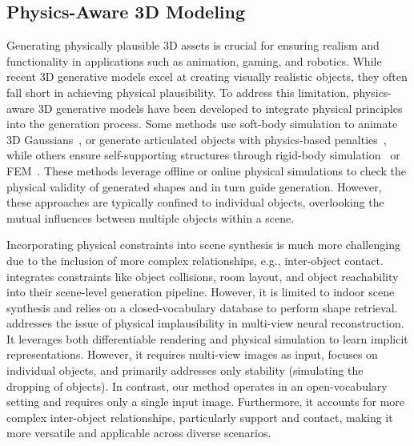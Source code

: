 \subsection{Physics-Aware 3D Modeling}
Generating physically plausible 3D assets is crucial for ensuring realism and functionality in applications such as animation, gaming, and robotics.
While recent 3D generative models excel at creating visually realistic objects, they often fall short in achieving physical plausibility. To address this limitation, physics-aware 3D generative models have been developed to integrate physical principles into the generation process. Some methods use soft-body simulation to animate 3D Gaussians~\cite{xie2024physgaussian,zhong2025reconstruction}, or generate articulated objects with physics-based penalties~\cite{liu2023few}, while others ensure self-supporting structures through rigid-body simulation~\cite{mezghanni2021physically,mezghanni2022physical,chen2024atlas3d} or FEM~\cite{guo2024physically,xu2024precise}. These methods leverage offline or online physical simulations to check the physical validity of generated shapes and in turn guide generation.
However, these approaches are typically confined to individual objects, overlooking the mutual influences between multiple objects within a scene. 

Incorporating physical constraints into scene synthesis is much more challenging due to the inclusion of more complex relationships, e.g., inter-object contact. \cite{yang2024physcene} integrates constraints like object collisions, room layout, and object reachability into their scene-level generation pipeline. However, it is limited to indoor scene synthesis and relies on a closed-vocabulary database to perform shape retrieval.
\cite{ni2024phyrecon} addresses the issue of physical implausibility in multi-view neural reconstruction. It leverages both differentiable rendering and physical simulation to learn implicit representations. However, it requires multi-view images as input, focuses on individual objects, and primarily addresses only stability (simulating the dropping of objects).
In contrast, our method operates in an open-vocabulary setting and requires only a single input image. Furthermore, it accounts for more complex inter-object relationships, particularly support and contact, making it more versatile and applicable across diverse scenarios.

